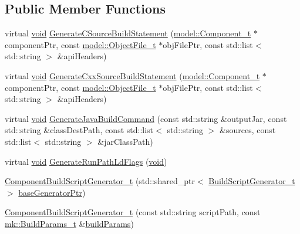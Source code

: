 \subsection*{Public Member Functions}
\begin{DoxyCompactItemize}
\item 
virtual \hyperlink{_t_e_m_p_l_a_t_e__cdef_8h_ac9c84fa68bbad002983e35ce3663c686}{void} \hyperlink{classninja_1_1_component_build_script_generator__t_a5803d8759fa9fca50086dec379ae8340}{Generate\+C\+Source\+Build\+Statement} (\hyperlink{structmodel_1_1_component__t}{model\+::\+Component\+\_\+t} $\ast$component\+Ptr, const \hyperlink{structmodel_1_1_object_file__t}{model\+::\+Object\+File\+\_\+t} $\ast$obj\+File\+Ptr, const std\+::list$<$ std\+::string $>$ \&api\+Headers)
\item 
virtual \hyperlink{_t_e_m_p_l_a_t_e__cdef_8h_ac9c84fa68bbad002983e35ce3663c686}{void} \hyperlink{classninja_1_1_component_build_script_generator__t_a6d75528106afacc4794518a265e0a80c}{Generate\+Cxx\+Source\+Build\+Statement} (\hyperlink{structmodel_1_1_component__t}{model\+::\+Component\+\_\+t} $\ast$component\+Ptr, const \hyperlink{structmodel_1_1_object_file__t}{model\+::\+Object\+File\+\_\+t} $\ast$obj\+File\+Ptr, const std\+::list$<$ std\+::string $>$ \&api\+Headers)
\item 
virtual \hyperlink{_t_e_m_p_l_a_t_e__cdef_8h_ac9c84fa68bbad002983e35ce3663c686}{void} \hyperlink{classninja_1_1_component_build_script_generator__t_a049f2c4544df40581e6a7a4a75077417}{Generate\+Java\+Build\+Command} (const std\+::string \&output\+Jar, const std\+::string \&class\+Dest\+Path, const std\+::list$<$ std\+::string $>$ \&sources, const std\+::list$<$ std\+::string $>$ \&jar\+Class\+Path)
\item 
virtual \hyperlink{_t_e_m_p_l_a_t_e__cdef_8h_ac9c84fa68bbad002983e35ce3663c686}{void} \hyperlink{classninja_1_1_component_build_script_generator__t_af1c96beaa12682998d514781613634f9}{Generate\+Run\+Path\+Ld\+Flags} (\hyperlink{_t_e_m_p_l_a_t_e__cdef_8h_ac9c84fa68bbad002983e35ce3663c686}{void})
\item 
\hyperlink{classninja_1_1_component_build_script_generator__t_ad5394908c91e44750ca16b504ed585f1}{Component\+Build\+Script\+Generator\+\_\+t} (std\+::shared\+\_\+ptr$<$ \hyperlink{classninja_1_1_build_script_generator__t}{Build\+Script\+Generator\+\_\+t} $>$ \hyperlink{structninja_1_1_require_base_generator__t_a3a16080268acf0b71c18eed619429f6a}{base\+Generator\+Ptr})
\item 
\hyperlink{classninja_1_1_component_build_script_generator__t_a6a4cae88325ccd76051fbacf51fbf957}{Component\+Build\+Script\+Generator\+\_\+t} (const std\+::string script\+Path, const \hyperlink{structmk_1_1_build_params__t}{mk\+::\+Build\+Params\+\_\+t} \&\hyperlink{structninja_1_1_require_base_generator__t_a78d7cecd653f49f8ad74fdbb65343705}{build\+Params})

\end{DoxyCompactItemize}
